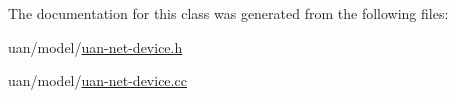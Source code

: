 The documentation for this class was generated from the following files\+:\begin{DoxyCompactItemize}
\item 
uan/model/\hyperlink{uan-net-device_8h}{uan-\/net-\/device.\+h}\item 
uan/model/\hyperlink{uan-net-device_8cc}{uan-\/net-\/device.\+cc}\end{DoxyCompactItemize}

